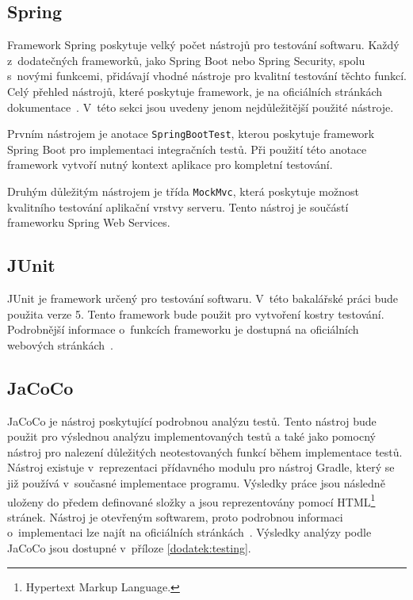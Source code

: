     \subsection{Spring}
        Framework Spring poskytuje velký počet nástrojů pro testování softwaru. Každý z~dodatečných frameworků, jako Spring Boot nebo Spring Security, spolu s~novými funkcemi, přidávají vhodné nástroje pro kvalitní testování těchto funkcí. Celý přehled nástrojů, které poskytuje framework, je na oficiálních stránkách dokumentace~\cite{spring-tests-doc}. V~této sekci jsou uvedeny jenom nejdůležitější použité nástroje.
        
        Prvním nástrojem je anotace \texttt{SpringBootTest}, kterou poskytuje framework Spring Boot pro implementaci integračních testů. Při použití této anotace framework vytvoří nutný kontext aplikace pro kompletní testování.
        
        Druhým důležitým nástrojem je třída \texttt{MockMvc}, která poskytuje možnost kvalitního testování aplikační vrstvy serveru. Tento nástroj je součástí frameworku Spring Web Services.
        
    \subsection{JUnit}
        JUnit je framework určený pro testování softwaru. V~této bakalářské práci bude použita verze 5. Tento framework bude použit pro vytvoření kostry testování. Podrobnější informace o~funkcích frameworku je dostupná na oficiálních webových stránkách~\cite{junit-doc}.
        
    \subsection{JaCoCo}\label{resere:testovani:jacoco}
        JaCoCo je nástroj poskytující podrobnou analýzu testů. Tento nástroj bude použit pro výslednou analýzu implementovaných testů a také jako pomocný nástroj pro nalezení důležitých neotestovaných funkcí během implementace testů. Nástroj existuje v~reprezentaci přídavného modulu pro nástroj Gradle, který se již používá v~současné implementace programu. Výsledky práce jsou následně uloženy do předem definované složky a jsou reprezentovány pomocí HTML\footnote{Hypertext Markup Language.} stránek. Nástroj je otevřeným softwarem, proto podrobnou informaci o~implementaci lze najít na oficiálních stránkách~\cite{jacoco-implementation}. Výsledky analýzy podle JaCoCo jsou dostupné v~příloze \ref{dodatek:testing}.
        
